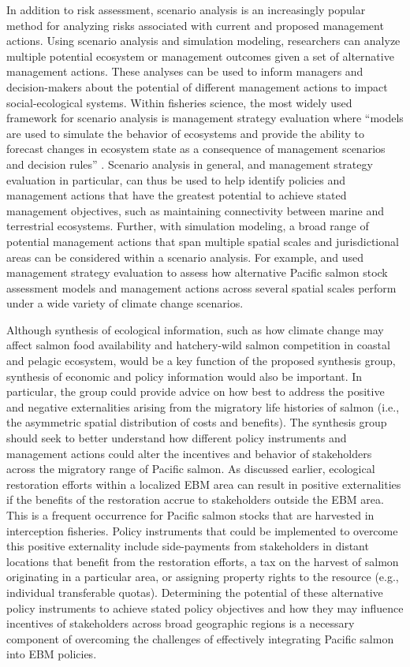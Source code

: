 In addition to risk assessment, scenario analysis is an increasingly popular
method for analyzing risks associated with current and proposed management
actions. Using scenario analysis and simulation modeling, researchers can
analyze multiple potential ecosystem or management outcomes given a set of
alternative management actions. These analyses can be used to inform managers
and decision-makers about the potential of different management actions to
impact social-ecological systems. Within fisheries science, the most widely used
framework for scenario analysis is management strategy evaluation where ``models
are used to simulate the behavior of ecosystems and provide the ability to
forecast changes in ecosystem state as a consequence of management scenarios and
decision rules'' \citep{Levin2009}. Scenario analysis in general, and management
strategy evaluation in particular, can thus be used to help identify policies
and management actions that have the greatest potential to achieve stated
management objectives, such as maintaining connectivity between marine and
terrestrial ecosystems. Further, with simulation modeling, a broad range of
potential management actions that span multiple spatial scales and
jurisdictional areas can be considered within a scenario analysis. For example,
\citet{Dorner2009a} and \citet{Dorner2013} used management strategy evaluation
to assess how alternative Pacific salmon stock assessment models and management
actions across several spatial scales perform under a wide variety of climate
change scenarios.

Although synthesis of ecological information, such as how climate change may
affect salmon food availability and hatchery-wild salmon competition in coastal
and pelagic ecosystem, would be a key function of the proposed synthesis group,
synthesis of economic and policy information would also be important. In
particular, the group could provide advice on how best to address the positive
and negative externalities arising from the migratory life histories of salmon
(i.e., the asymmetric spatial distribution of costs and benefits). The synthesis
group should seek to better understand how different policy instruments and
management actions could alter the incentives and behavior of stakeholders
across the migratory range of Pacific salmon. As discussed earlier, ecological
restoration efforts within a localized EBM area can result in positive
externalities if the benefits of the restoration accrue to stakeholders outside
the EBM area. This is a frequent occurrence for Pacific salmon stocks that are
harvested in interception fisheries. Policy instruments that could be
implemented to overcome this positive externality include side-payments from
stakeholders in distant locations that benefit from the restoration efforts, a
tax on the harvest of salmon originating in a particular area, or assigning
property rights to the resource (e.g., individual transferable quotas).
Determining the potential of these alternative policy instruments to achieve
stated policy objectives and how they may influence incentives of stakeholders
across broad geographic regions is a necessary component of overcoming the
challenges of effectively integrating Pacific salmon into EBM policies.


